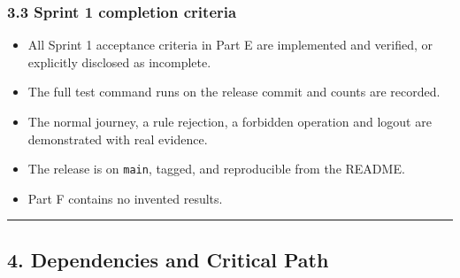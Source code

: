 \documentclass[12pt,a4paper]{article}
\begin{document}
\subsubsection*{3.3 Sprint 1 completion criteria}
\begin{itemize}[leftmargin=*]
\item All Sprint 1 acceptance criteria in Part E are implemented and verified, or explicitly disclosed as incomplete.
\item The full test command runs on the release commit and counts are recorded.
\item The normal journey, a rule rejection, a forbidden operation and logout are demonstrated with real evidence.
\item The release is on \texttt{main}, tagged, and reproducible from the README.
\item Part F contains no invented results.
\end{itemize}

\medskip\noindent\rule{\linewidth}{0.4pt}\medskip

\subsection*{4. Dependencies and Critical Path}
\end{document}
